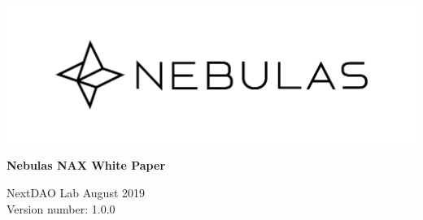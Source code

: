 \documentclass[12pt]{article}
\begin{document}
\pagestyle{empty}
\renewcommand{\contentsname}{Catalog}
\renewcommand{\abstractname}{Abstract}
\renewcommand{\refname}{References}
\renewcommand{\figurename}{Figure}
\renewcommand{\tablename}{Table}
\renewcommand{\baselinestretch}{1.5}
\renewcommand{\appendixname}{Appendix}
\renewcommand{\proofname}{proof}


\begin{titlepage}
  \begin{center}
    \vspace*{5.5cm}
    \includegraphics[scale=0.4]{../common/Nebulas.png}
    \vspace{0.5cm}

    \textbf{\huge{Nebulas NAX White Paper}}

    \vspace{0.5cm}
    NextDAO Lab
    \vfill
    August 2019 \\
    Version number: 1.0.0
    \textbf{}
  \end{center}

\end{titlepage}
\setcounter{page}{0}
\tableofcontents
\newpage
\setcounter{page}{1}
\pagestyle{fancy}
\vspace*{0.01cm}
%





\newpage


\newpage 
\begin{appendices}


\end{appendices}
\end{document}
